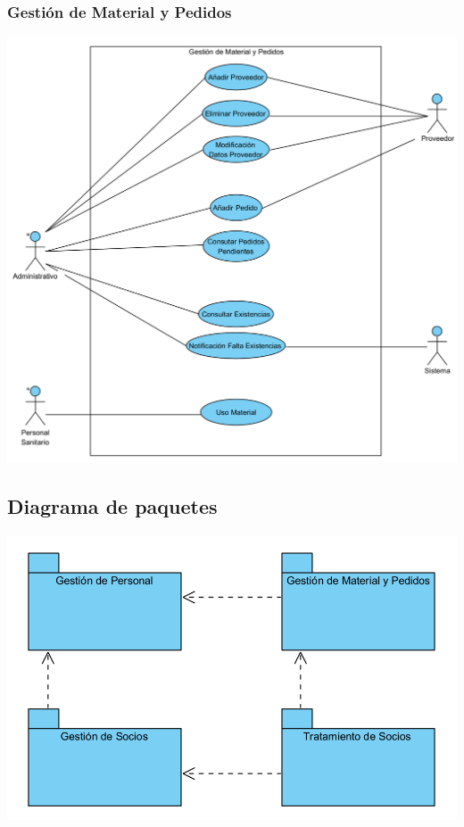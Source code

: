\documentclass[12pt, spanish]{article}
\begin{document}
\subsubsection*{Gestión de Material y Pedidos}
\begin{centering}\includegraphics[scale = 0.50]{diagramas_cu/4.png}\\[1.0 cm]\end{centering}


\subsection{Diagrama de paquetes}

\begin{centering}\includegraphics[scale = 0.70]{paquetes.png}\\[1.0 cm]\end{centering}
\end{document}
